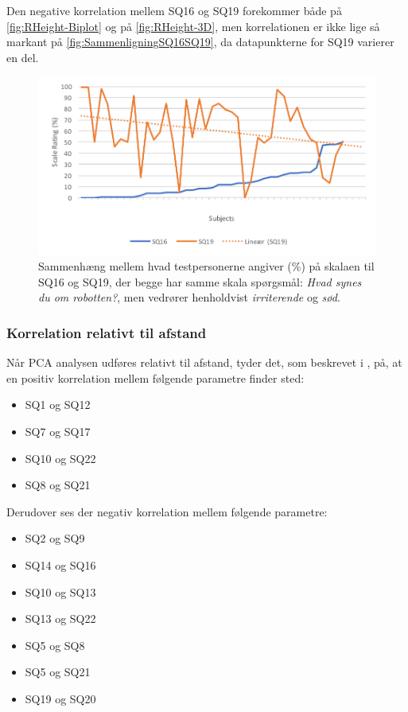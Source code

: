 \noindent
%
Den negative korrelation mellem SQ16 og SQ19 forekommer både på \autoref{fig:RHeight-Biplot} og på \autoref{fig:RHeight-3D}, men korrelationen er ikke lige så markant på \autoref{fig:SammenligningSQ16SQ19}, da datapunkterne for SQ19 varierer en del.  
%
\begin{figure}[H]
	\centering
	\includegraphics[width=\textwidth]{Figure/Korrelationsgrafer/SQ16+SQ19}
	\caption{Sammenhæng mellem hvad testpersonerne angiver (\%) på skalaen til SQ16 og SQ19, der begge har samme skala spørgsmål: \textit{Hvad synes du om robotten?}, men vedrører henholdvist \textit{irriterende} og \textit{sød}.}
	\label{fig:SammenligningSQ16SQ19}
\end{figure}
\noindent
%








\subsubsection{Korrelation relativt til afstand}
Når PCA analysen udføres relativt til afstand, tyder det, som beskrevet i , på, at en positiv korrelation mellem følgende parametre finder sted:
\begin{itemize}
	\item SQ1 og SQ12
	\item SQ7 og SQ17
	\item SQ10 og SQ22
	\item SQ8 og SQ21
\end{itemize}
%
Derudover ses der negativ korrelation mellem følgende parametre:
\begin{itemize}
	\item SQ2 og SQ9
	\item SQ14 og SQ16
	\item SQ10 og SQ13
	\item SQ13 og SQ22
	\item SQ5 og SQ8
	\item SQ5 og SQ21
	\item SQ19 og SQ20
\end{itemize}

